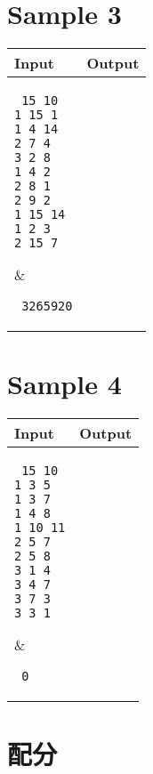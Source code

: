 \documentclass[11pt,a4paper]{article}
\begin{document}
\newpage
\section*{Sample 3}
\begin{longtable}[!h]{|p{}|p{}|}
\hline
\textbf {Input}	& \textbf {Output} \\
\hline
\parbox[t]{0.5\textwidth} %
{ \tt
15 10 \\
1 15 1 \\
1 4 14 \\
2 7 4 \\
3 2 8 \\
1 4 2 \\
2 8 1 \\
2 9 2 \\
1 15 14 \\
1 2 3 \\
2 15 7 \\
} &
\parbox[t]{0.5\textwidth}
{ \tt
3265920 \\
} \\
\hline
\end{longtable}

\section*{Sample 4}
\begin{longtable}[!h]{|p{}|p{}|}
\hline
\textbf {Input}	& \textbf {Output} \\
\hline
\parbox[t]{0.5\textwidth} %
{ \tt
15 10 \\
1 3 5 \\
1 3 7 \\
1 4 8 \\
1 10 11 \\
2 5 7 \\
2 5 8 \\
3 1 4 \\
3 4 7 \\
3 7 3 \\
3 3 1 \\
} &
\parbox[t]{0.5\textwidth}
{ \tt
0 \\
} \\
\hline
\end{longtable}

\newpage
\section*{配分}
\end{document}

